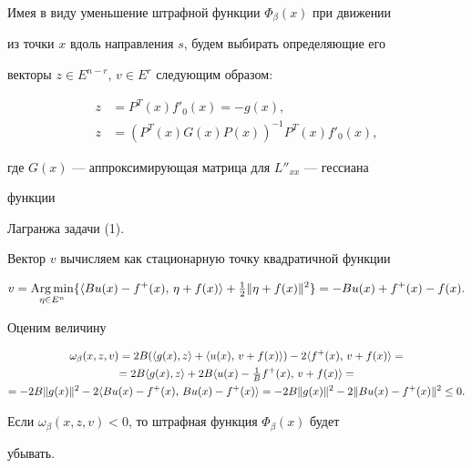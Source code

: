  


Имея в виду уменьшение штрафной функции $\Phi_\beta(x)$ при движении 


из точки $x$ вдоль направления $s$, будем выбирать определяющие его 


векторы $z\in E^{n-r}$, $v\in E^r$ следующим образом:


\begin{align} 


z&=P^T(x)f'_0(x)=-g(x),\\ 


z&=(P^T(x)G(x)P(x))^{-1}P^T(x)f'_0(x), 


\end{align} 


где $G(x)$ --- аппроксимирующая матрица для $L''_{xx}$ --- гессиана 


функции 


Лагранжа задачи (1). 


 


Вектор $v$ вычисляем как стационарную точку квадратичной функции 


\begin{equation} 


v=\Argmin_{\eta\in E^n}\{\la B u(x)-f^+(x),\,\eta+f(x)\ra+ 


\tfrac{1}{2}\|\eta+f(x)\|^2\}=-B u(x)+f^+(x)-f(x). 


\end{equation} 


 


Оценим величину


\begin{multline*} 


\omega_\beta(x,z,v)=2B(\la g(x),z\ra+\la u(x),\,v+f(x)\ra)- 


2\la f^+(x),\,v+f(x)\ra=\\ 


=2B\la g(x),z\ra+2B\la u(x)-\tfrac{1}{B}f^+(x),\,v+f(x)\ra= \\ 


=-2B\|g(x)\|^2-2\la B u(x)-f^+(x),\,B u(x)-f^+(x)\ra= 


-2B\|g(x)\|^2-2\|B u(x)-f^+(x)\|^2\le 0. 


\end{multline*} 


Если $\omega_\beta(x,z,v)<0$, то штрафная функция $\Phi_\beta(x)$ будет 


убывать. 


